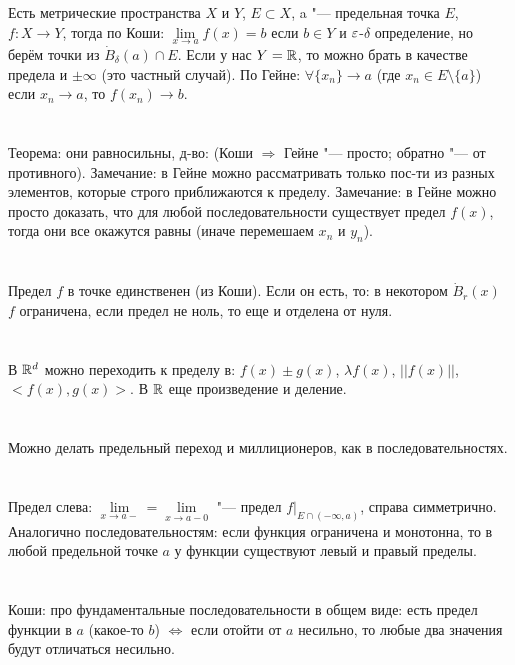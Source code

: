 \section{} %
Есть метрические пространства $X$ и $Y$, $E \subset X$, a "--- предельная точка $E$, $f: X \to Y$,
тогда по Коши: $\lim\limits_{x\to a} f(x) = b$ если $b \in Y$ и $\varepsilon$-$\delta$ определение,
но берём точки из $\dot B_\delta(a) \cap E$. Если у нас $Y=\mathbb{R}$, то можно брать в качестве предела
и $\pm\infty$ (это частный случай).
По Гейне: $\forall \{x_n\} \to a$ (где $x_n\in E \setminus \{a\}$) если $x_n \to a$, то $f(x_n) \to b$.

\section{} %
Теорема: они равносильны, д-во: (Коши $\Rightarrow$ Гейне "--- просто; обратно "--- от противного).
Замечание: в Гейне можно рассматривать только пос-ти из разных элементов, которые строго приближаются к пределу.
Замечание: в Гейне можно просто доказать, что для любой последовательности существует предел $f(x)$, тогда
они все окажутся равны (иначе перемешаем $x_n$ и $y_n$).

\section{} %
Предел $f$ в точке единственен (из Коши). Если он есть, то: в некотором $\dot B_r(x)$ $f$ ограничена,
если предел не ноль, то еще и отделена от нуля.

\section{} %
В $\mathbb{R}^d$ можно переходить к пределу в: $f(x) \pm g(x)$, $\lambda f(x)$, $||f(x)||$, $<f(x), g(x)>$.
В $\mathbb{R}$ еще произведение и деление.

\section{} %
Можно делать предельный переход и миллиционеров, как в последовательностях.

\section{} %
Предел слева: $\lim\limits_{x\to a-} = \lim\limits_{x\to a-0}$ "--- предел $f|_{E\cap(-\infty,a)}$,
справа симметрично.
Аналогично последовательностям: если функция ограничена и монотонна, то в любой предельной точке $a$ у функции существуют левый и правый пределы.

\section{} %
Коши: про фундаментальные последовательности в общем виде: есть предел функции в $a$ (какое-то $b$) $\iff$ если отойти от $a$ несильно, то любые два значения будут отличаться
несильно.
